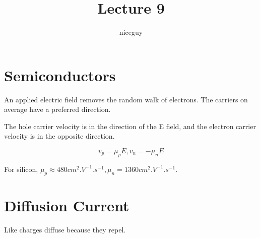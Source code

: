 \documentclass[12pt]{article}
\title{Lecture 9}
\author{niceguy}
\begin{document}
\maketitle

\section{Semiconductors}

\begin{defn}
    An applied electric field removes the random walk of electrons. The carriers on average have a preferred direction.
\end{defn}
    
The hole carrier velocity is in the direction of the E field, and the electron carrier velocity is in the opposite direction.

$$v_p = \mu_pE, v_n = -\mu_nE$$

For silicon, $\mu_p \approx 480 \unit{cm^2.V^{-1}.s^{-1}}, \mu_n = 1360\unit{cm^2.V^{-1}.s^{-1}}$.

\section{Diffusion Current}

Like charges diffuse because they repel.
\end{document}
